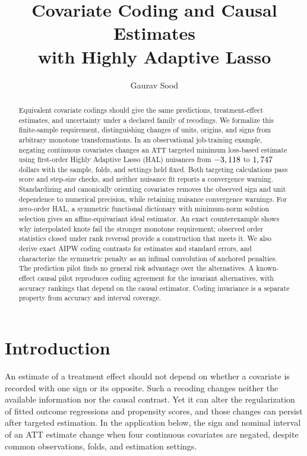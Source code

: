 \documentclass[11pt]{article}
\title{Covariate Coding and Causal Estimates\\with Highly Adaptive Lasso}
\author{Gaurav Sood}
\date{}
\theoremstyle{definition}
\theoremstyle{remark}
\begin{document}
\maketitle

\begin{abstract}
Equivalent covariate codings should give the same predictions,
treatment-effect estimates, and uncertainty under a declared family of
recodings. We formalize this finite-sample requirement, distinguishing
changes of units, origins, and signs from arbitrary monotone transformations.
In an observational job-training example, negating continuous covariates
changes an ATT targeted minimum loss-based estimate using first-order
Highly Adaptive Lasso (HAL) nuisances from $-3,118$ to
$1,747$ dollars with the sample, folds, and settings held fixed.
Both targeting calculations pass score and step-size checks, and neither
nuisance fit reports a convergence warning. Standardizing and canonically
orienting covariates removes the observed sign and unit dependence to
numerical precision, while retaining nuisance convergence warnings.
For zero-order HAL, a symmetric functional dictionary with minimum-norm
solution selection gives an affine-equivariant ideal estimator. An exact
counterexample shows why interpolated knots fail the stronger monotone
requirement; observed order statistics closed under rank reversal provide
a construction that meets it. We also derive exact AIPW coding contrasts
for estimates and standard errors, and characterize the symmetric penalty
as an infimal convolution of anchored penalties. The prediction pilot finds
no general risk advantage over the alternatives. A known-effect causal
pilot reproduces coding agreement for the invariant alternatives, with
accuracy rankings that depend on the causal estimator. Coding invariance
is a separate property from accuracy and interval coverage.
\end{abstract}

\section{Introduction}

An estimate of a treatment effect should not depend on whether a covariate
is recorded with one sign or its opposite. Such a recoding changes neither
the available information nor the causal contrast. Yet it can alter the
regularization of fitted outcome regressions and propensity scores, and
those changes can persist after targeted estimation. In the application
below, the sign and nominal interval of an ATT estimate change when four
continuous covariates are negated, despite common observations, folds, and
estimation settings.
\end{document}
